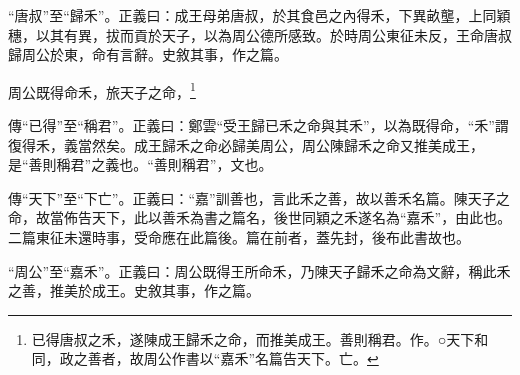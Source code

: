 {\noindent\shu{}\fzkt “唐叔”至“歸禾”。正義曰：成王母弟唐叔，於其食邑之內得禾，下異畝壟，上同穎穗，以其有異，拔而貢於天子，以為周公德所感致。於時周公東征未反，王命唐叔歸周公於東，命有言辭。史敘其事，作之篇。 \par}

周公既得命禾，旅天子之命，\footnote{已得唐叔之禾，遂陳成王歸禾之命，而推美成王。善則稱君。作。○天下和同，政之善者，故周公作書以“嘉禾”名篇告天下。亡。}

{\noindent\zhuan{}\fzbyks 傳“已得”至“稱君”。正義曰：鄭雲“受王歸已禾之命與其禾”，以為既得命，“禾”謂復得禾，義當然矣。成王歸禾之命必歸美周公，周公陳歸禾之命又推美成王，是“善則稱君”之義也。“善則稱君”，文也。 \par}

{\noindent\zhuan{}\fzbyks 傳“天下”至“下亡”。正義曰：“嘉”訓善也，言此禾之善，故以善禾名篇。陳天子之命，故當佈告天下，此以善禾為書之篇名，後世同穎之禾遂名為“嘉禾”，由此也。二篇東征未還時事，受命應在此篇後。篇在前者，蓋先封，後布此書故也。 \par}

{\noindent\shu{}\fzkt “周公”至“嘉禾”。正義曰：周公既得王所命禾，乃陳天子歸禾之命為文辭，稱此禾之善，推美於成王。史敘其事，作之篇。 \par}

